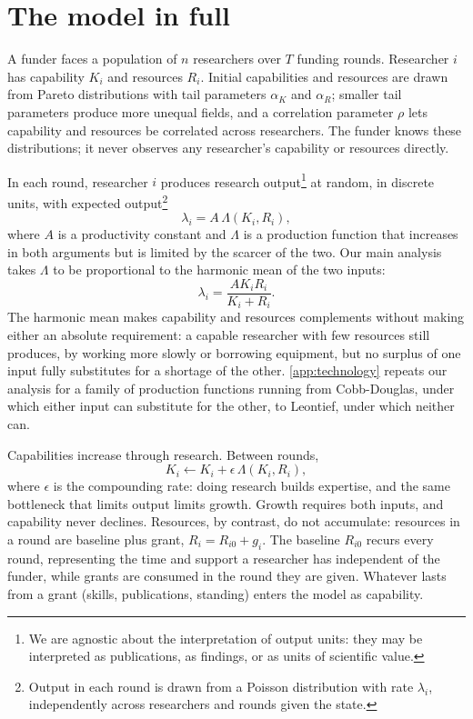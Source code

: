 \section{The model in full}\label{sec:model}

A funder faces a population of $n$ researchers over $T$ funding rounds. Researcher $i$ has capability $K_i$ and resources $R_i$. Initial capabilities and resources are drawn from Pareto distributions with tail parameters $\alpha_K$ and $\alpha_R$; smaller tail parameters produce more unequal fields, and a correlation parameter $\rho$ lets capability and resources be correlated across researchers. The funder knows these distributions; it never observes any researcher's capability or resources directly.

In each round, researcher $i$ produces research output\footnote{We are agnostic about the interpretation of output units: they may be interpreted as publications, as findings, or as units of scientific value.} at random, in discrete units, with expected output\footnote{Output in each round is drawn from a Poisson distribution with rate $\lambda_i$, independently across researchers and rounds given the state.}
\[
\lambda_i = A\,\Lambda(K_i, R_i),
\]
where $A$ is a productivity constant and $\Lambda$ is a production function that increases in both arguments but is limited by the scarcer of the two. Our main analysis takes $\Lambda$ to be proportional to the harmonic mean of the two inputs:
\[
\lambda_i = \frac{A K_i R_i}{K_i + R_i}.
\]
The harmonic mean makes capability and resources complements without making either an absolute requirement: a capable researcher with few resources still produces, by working more slowly or borrowing equipment, but no surplus of one input fully substitutes for a shortage of the other. \ref{app:technology} repeats our analysis for a family of production functions running from Cobb-Douglas, under which either input can substitute for the other, to Leontief, under which neither can.

Capabilities increase through research. Between rounds,
\[
K_i \leftarrow K_i + \epsilon\,\Lambda(K_i, R_i),
\]
where $\epsilon$ is the compounding rate: doing research builds expertise, and the same bottleneck that limits output limits growth. Growth requires both inputs, and capability never declines. Resources, by contrast, do not accumulate: resources in a round are baseline plus grant, $R_i = R_{i0} + g_i$. The baseline $R_{i0}$ recurs every round, representing the time and support a researcher has independent of the funder, while grants are consumed in the round they are given. Whatever lasts from a grant (skills, publications, standing) enters the model as capability.

